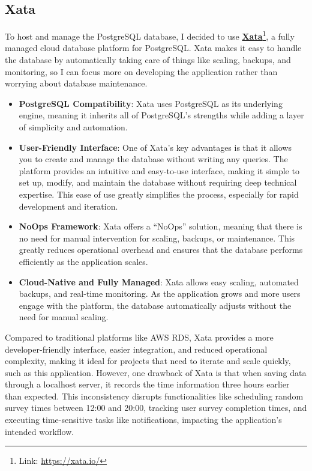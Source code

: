 \subsection{Xata}
To host and manage the PostgreSQL database, I decided to use \textbf{\href{https://xata.io/}{Xata}}\footnote{Link: \url{https://xata.io/}}, a fully managed cloud database platform for PostgreSQL. Xata makes it easy to handle the database by automatically taking care of things like scaling, backups, and monitoring, so I can focus more on developing the application rather than worrying about database maintenance.
\begin{itemize}
    \item \textbf{PostgreSQL Compatibility}: Xata uses PostgreSQL as its underlying engine, meaning it inherits all of PostgreSQL’s strengths while adding a layer of simplicity and automation.
    \item \textbf{User-Friendly Interface}: One of Xata's key advantages is that it allows you to create and manage the database without writing any queries. The platform provides an intuitive and easy-to-use interface, making it simple to set up, modify, and maintain the database without requiring deep technical expertise. This ease of use greatly simplifies the process, especially for rapid development and iteration.
    \item \textbf{NoOps Framework}: Xata offers a ``NoOps'' solution, meaning that there is no need for manual intervention for scaling, backups, or maintenance. This greatly reduces operational overhead and ensures that the database performs efficiently as the application scales.
    \item \textbf{Cloud-Native and Fully Managed}: Xata allows easy scaling, automated backups, and real-time monitoring. As the application grows and more users engage with the platform, the database automatically adjusts without the need for manual scaling.
\end{itemize}

\noindent Compared to traditional platforms like AWS RDS, Xata provides a more developer-friendly interface, easier integration, and reduced operational complexity, making it ideal for projects that need to iterate and scale quickly, such as this application. However, one drawback of Xata is that when saving data through a localhost server, it records the time information three hours earlier than expected. This inconsistency disrupts functionalities like scheduling random survey times between 12:00 and 20:00, tracking user survey completion times, and executing time-sensitive tasks like notifications, impacting the application's intended workflow.

